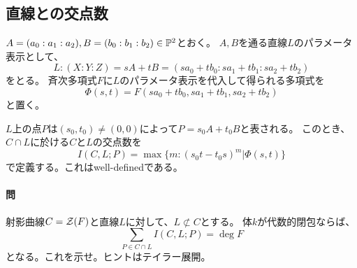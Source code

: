 \documentclass[a4paper]{jsarticle}
\begin{document}
    \subsection{直線との交点数}
    $A=(a_0:a_1:a_2), B=(b_0:b_1:b_2) \in \mathbb{P}^2$とおく。
    $A, B$を通る直線$L$のパラメータ表示として、
    \[ L: (X:Y:Z)=sA+tB=(s a_0+t b_0:s a_1+t b_1:s a_2+t b_2) \]
    をとる。
    斉次多項式$F$に$L$のパラメータ表示を代入して得られる多項式を
    \[ \Phi(s,t)=F(s a_0+t b_0, s a_1+t b_1, s a_2+t b_2) \]
    と置く。

    $L$上の点$P$は$(s_0, t_0) \neq (0, 0)$によって$P=s_0 A+t_0 B$と表される。
    このとき、$C \cap L$に於ける$C$と$L$の交点数を
    \[ I(C, L; P)=\max \{ m : (s_0 t-t_0 s)^m | \Phi(s,t) \} \]
    で定義する。これはwell-definedである。

    \paragraph{問}
    射影曲線$C=\mathcal{Z}(F)$と直線$L$に対して、$L \not \subset C$とする。
    体$k$が代数的閉包ならば、
    \[ \sum_{P \in C \cap L}{I(C, L; P)}=\deg F \]
    となる。これを示せ。ヒントはテイラー展開。
\end{document}
